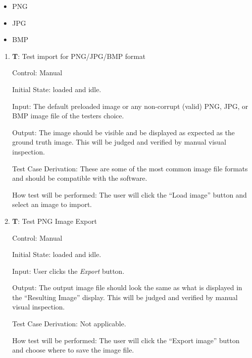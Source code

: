 \documentclass[12pt, titlepage]{article}
\newcounter{testnum} %
\begin{document}
\begin{itemize}
  \item{PNG}
  \item{JPG}
  \item{BMP\\}
\end{itemize}

\begin{enumerate}

  \item{\textbf{T\thetestnum \label{T_inputImage}}: Test import for PNG/JPG/BMP format\\}
            
  Control: Manual
            
  Initial State: \progname{} loaded and idle.
            
  Input: The default preloaded image or any non-corrupt (valid) PNG, JPG, or BMP image file of the testers choice.
            
  Output: The image should be visible and be displayed as expected as the ground truth image.
    This will be judged and verified by manual visual inspection.
            
  Test Case Derivation: These are some of the most common image file formats and should be compatible with the software.
            
  How test will be performed: The user will click the ``Load image'' button and select an image to import.

  \item{\textbf{T\thetestnum \label{T_exportImage}}: Test PNG Image Export\\}
              
  Control: Manual
            
  Initial State: \progname{} loaded and idle.
            
  Input: User clicks the \textit{Export} button.
            
  Output: The output image file should look the same as what is displayed in the ``Resulting Image'' display.
    This will be judged and verified by manual visual inspection.

  Test Case Derivation: Not applicable.

  How test will be performed: The user will click the ``Export image'' button and choose where to save the image file.

\end{enumerate}
\end{document}
